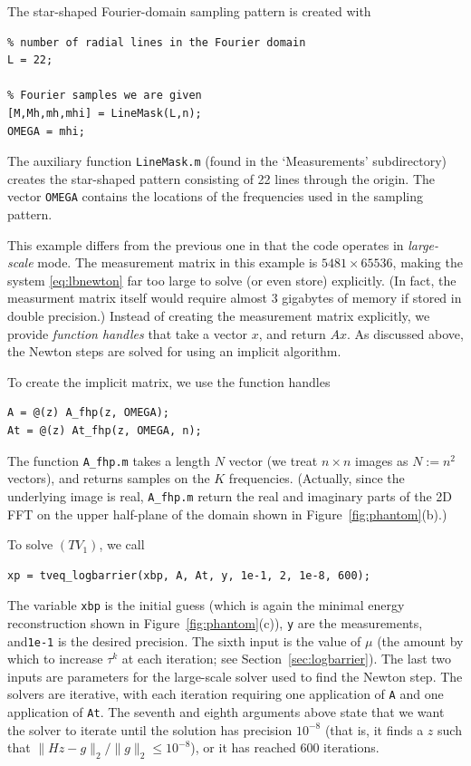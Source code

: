 \documentclass{article}
\newcommand{\<}{\langle}
\renewcommand{\>}{\rangle}
\begin{document}
The star-shaped Fourier-domain sampling pattern is created with
\begin{verbatim}
% number of radial lines in the Fourier domain
L = 22;

% Fourier samples we are given
[M,Mh,mh,mhi] = LineMask(L,n);
OMEGA = mhi;
\end{verbatim}
The auxiliary function \texttt{LineMask.m} (found in the `Measurements' subdirectory) creates the star-shaped pattern consisting of 22 lines through the origin.  The vector \texttt{OMEGA} 
contains the locations of the frequencies used in the sampling pattern.

This example differs from the previous one in that the code operates in {\em large-scale} mode.  The measurement matrix in this example is $5481\times 65536$, making the system \eqref{eq:lbnewton} far too large to solve (or even store) explicitly.  (In fact, the measurment matrix itself would require almost 3 gigabytes of memory if stored in double precision.)  Instead of creating the measurement matrix explicitly, we provide {\em function handles} that take a vector $x$, and return $Ax$.  As discussed above, the Newton steps are solved for using an implicit algorithm.

To create the implicit matrix, we use the function handles
\begin{verbatim}
A = @(z) A_fhp(z, OMEGA);
At = @(z) At_fhp(z, OMEGA, n);
\end{verbatim}
The function \texttt{A\_fhp.m} takes a length $N$ vector (we treat $n\times n$ images as $N:=n^2$ vectors), and returns samples on the $K$ frequencies.  (Actually, since the underlying image is real, \texttt{A\_fhp.m} return the real and imaginary parts of the 2D FFT on the upper half-plane of the domain shown in Figure~\ref{fig:phantom}(b).)  

To solve $(TV_1)$, we call
\begin{verbatim}
xp = tveq_logbarrier(xbp, A, At, y, 1e-1, 2, 1e-8, 600);
\end{verbatim}
The variable \texttt{xbp} is the initial guess (which is again the minimal energy reconstruction shown in Figure~\ref{fig:phantom}(c)), \texttt{y} are the measurements, and\texttt{1e-1} is the desired precision.  The sixth input is the value of $\mu$ (the amount by which to increase $\tau^k$ at each iteration; see Section~\ref{sec:logbarrier}).  The last two inputs are parameters for the large-scale solver used to find the Newton step.  The solvers are iterative, with each iteration requiring one application of \texttt{A} and one application of \texttt{At}.  The seventh and eighth arguments above state that we want the solver to iterate until the solution has precision $10^{-8}$ (that is, it finds a $z$ such that $\|Hz-g\|_2/\|g\|_2 \leq 10^{-8}$), or it has reached 600 iterations.
\end{document}
